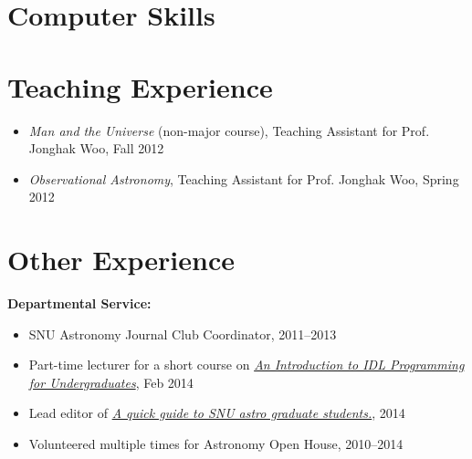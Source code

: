 \documentclass[11pt,letterpaper,roman]{moderncv}        %
\begin{document}
\section{Computer Skills}

\section{Teaching Experience}
\begin{itemize}
\setlength\itemsep{0.0em}
\item \textit{Man and the Universe} (non-major course), Teaching
  Assistant for Prof. Jonghak Woo,  Fall 2012
\item \textit{Observational Astronomy}, Teaching Assistant for
  Prof. Jonghak Woo, Spring 2012
\end{itemize}

\section{Other Experience}
\textbf{Departmental Service:}
\begin{itemize}
\setlength\itemsep{0.0em}
\item SNU Astronomy Journal Club Coordinator, 2011--2013
\item Part-time lecturer for a short course on
  \href{http://astro.snu.ac.kr/~idl_lecture}{\textit{\color{dodgerblue}An Introduction
      to IDL Programming for Undergraduates}}, Feb 2014
\item Lead editor of 
  \href{https://github.com/astrosnu/grad_manual}{\color{dodgerblue}\textit{A quick guide
      to SNU astro graduate students.}}, 2014
\item Volunteered multiple times for Astronomy Open House, 2010--2014
\end{itemize}

\end{document}

